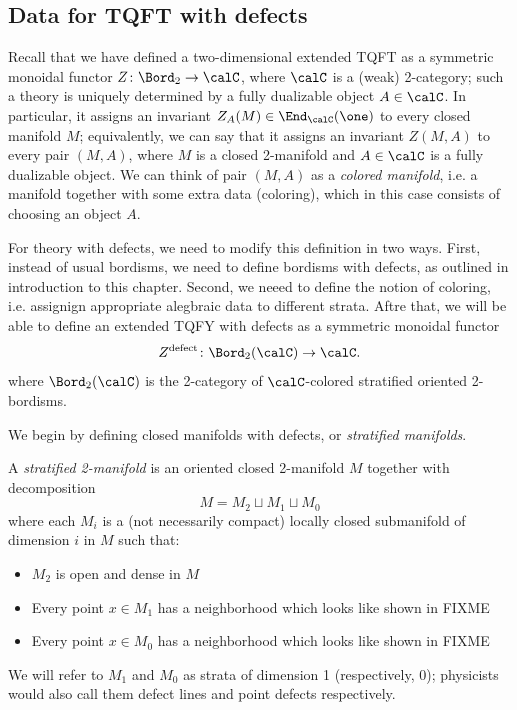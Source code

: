 \begin{defectfiguresetup}
\section{Data for TQFT with defects}\label{s:defect-data}
Recall that we have defined a two-dimensional extended TQFT as a symmetric
monoidal functor $Z\colon \Bord_2\to \calC$, where $\calC$ is a (weak)
2-category; such a theory is uniquely determined by a fully dualizable object
$A\in \calC$. In particular, it assigns an invariant $Z_A(M)\in
\End_\calC(\one)$ to every closed manifold $M$; equivalently, we can say that
it assigns an invariant $Z(M,A)$ to every pair $(M, A)$, where $M$ is a closed
2-manifold and $A\in \calC$ is a fully dualizable object. We can think of pair
$(M,A)$ as a \emph{colored manifold}, i.e. a manifold together with some extra
data (coloring), which in this case consists of choosing an object $A$.

For theory with defects, we need to modify this definition in two ways. First,
instead of usual bordisms, we need to define bordisms with defects,  as
outlined in introduction to this chapter. Second, we neeed to define the notion
of coloring, i.e. assignign appropriate alegbraic data to different strata.
Aftre that, we will be able to define an extended TQFY with defects as a
symmetric monoidal functor
$$
Z^{\mathrm{defect}}\colon \Bord_2(\calC)\to \calC.
$$
where $\Bord_2(\calC)$ is the 2-category of $\calC$-colored stratified oriented
2-bordisms.


We begin by defining closed manifolds
with defects, or \emph{stratified manifolds}.

\begin{definition}\label{d:stratified_manifold}
  A \emph{stratified 2-manifold} is an
  oriented closed 2-manifold $M$ together with  decomposition
  $$
    M=M_2\sqcup M_1\sqcup M_0
  $$
  where each $M_i$ is a (not necessarily compact) locally closed submanifold
  of dimension $i$ in $M$ such that:
  \begin{itemize}
    \item $M_2$ is open and dense in $M$
    \item Every point $x\in M_1$ has a neighborhood which looks like shown in
    FIXME
    \item Every point $x\in M_0$ has a neighborhood which looks like shown in
    FIXME
  \end{itemize}
\end{definition}
We will refer to $M_1$ and $M_0$ as strata of dimension 1 (respectively, 0);
physicists would also call them defect lines and point defects respectively.


\end{defectfiguresetup}
